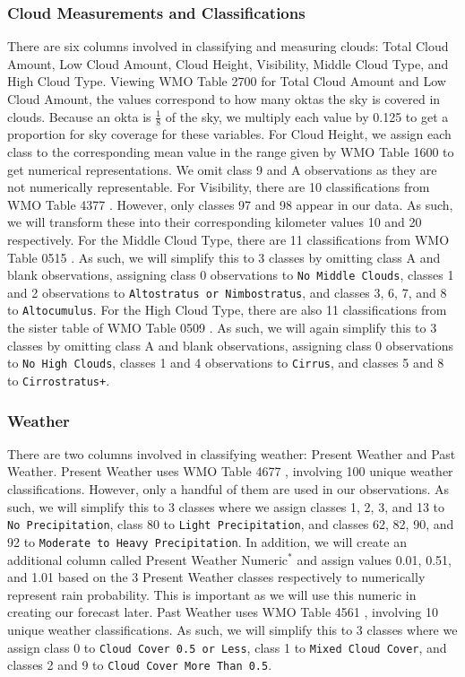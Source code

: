 \documentclass{article}
\begin{document}
\subsubsection*{Cloud Measurements and Classifications}

There are six columns involved in classifying and measuring clouds: Total Cloud Amount, Low Cloud Amount, Cloud Height, Visibility, Middle Cloud Type, and High Cloud Type. Viewing WMO Table 2700 \cite{WMOCodes2017} for Total Cloud Amount and Low Cloud Amount, the values correspond to how many oktas the sky is covered in clouds. Because an okta is $\frac{1}{8}$ of the sky, we multiply each value by 0.125 to get a proportion for sky coverage for these variables. For Cloud Height, we assign each class to the corresponding mean value in the range given by WMO Table 1600 \cite{WMOCodes2017} to get numerical representations. We omit class 9 and A observations as they are not numerically representable. For Visibility, there are 10 classifications from WMO Table 4377 \cite{WMOCodes2017}. However, only classes 97 and 98 appear in our data. As such, we will transform these into their corresponding kilometer values 10 and 20 respectively. For the Middle Cloud Type, there are 11 classifications from WMO Table 0515 \cite{WMOCodes2017}. As such, we will simplify this to 3 classes by omitting class A and blank observations, assigning class 0 observations to \texttt{No Middle Clouds}, classes 1 and 2 observations to \texttt{Altostratus or Nimbostratus}, and classes 3, 6, 7, and 8 to \texttt{Altocumulus}. For the High Cloud Type, there are also 11 classifications from the sister table of WMO Table 0509 \cite{WMOCodes2017}. As such, we will again simplify this to 3 classes by omitting class A and blank observations, assigning class 0 observations to \texttt{No High Clouds}, classes 1 and 4 observations to \texttt{Cirrus}, and classes 5 and 8 to \texttt{Cirrostratus+}.

\subsubsection*{Weather}

There are two columns involved in classifying weather: Present Weather and Past Weather. Present Weather uses WMO Table 4677 \cite{WMOCodes2017}, involving 100 unique weather classifications. However, only a handful of them are used in our observations. As such, we will simplify this to 3 classes where we assign classes 1, 2, 3, and 13 to \texttt{No Precipitation}, class 80 to \texttt{Light Precipitation}, and classes 62, 82, 90, and 92 to \texttt{Moderate to Heavy Precipitation}. In addition, we will create an additional column called Present Weather Numeric$^*$ and assign values 0.01, 0.51, and 1.01 based on the 3 Present Weather classes respectively to numerically represent rain probability. This is important as we will use this numeric in creating our forecast later. Past Weather uses WMO Table 4561 \cite{WMOCodes2017}, involving 10 unique weather classifications. As such, we will simplify this to 3 classes where we assign class 0 to \texttt{Cloud Cover 0.5 or Less}, class 1 to \texttt{Mixed Cloud Cover}, and classes 2 and 9 to \texttt{Cloud Cover More Than 0.5}.
\end{document}
